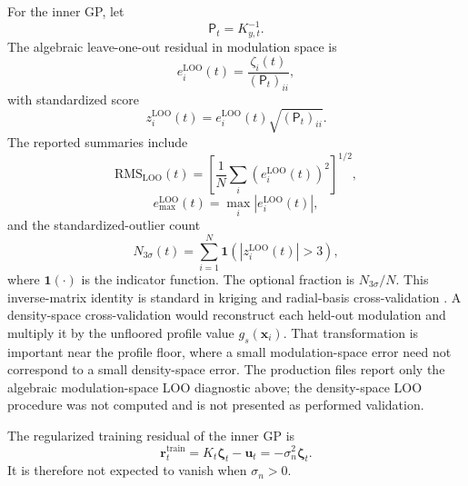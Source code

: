 \documentclass[
  11pt,
  letterpaper,
  onehalfspacing,
  normalmargins,
  equalmargins,
  oneside
]{ut-thesis}
\begin{document}
For the inner GP, let
\begin{equation}
\mathsf P_t=K_{y,t}^{-1}.
\label{eq:gp-loo-inverse-current}
\end{equation}
The algebraic leave-one-out residual in modulation space is
\begin{equation}
 e_i^{\mathrm{LOO}}(t)
=
\frac{\zeta_i(t)}{(\mathsf P_t)_{ii}},
\label{eq:gp-current-loo-residual}
\end{equation}
with standardized score
\begin{equation}
 z_i^{\mathrm{LOO}}(t)
=
 e_i^{\mathrm{LOO}}(t)
\sqrt{(\mathsf P_t)_{ii}}.
\label{eq:gp-current-loo-zscore}
\end{equation}
The reported summaries include
\begin{equation}
\mathrm{RMS}_{\mathrm{LOO}}(t)
=
\left[
\frac{1}{N}
\sum_i
\left(e_i^{\mathrm{LOO}}(t)\right)^2
\right]^{1/2},
\label{eq:gp-loo-rms}
\end{equation}
\begin{equation}
 e_{\max}^{\mathrm{LOO}}(t)
=
\max_i
\left|e_i^{\mathrm{LOO}}(t)\right|,
\label{eq:gp-loo-max}
\end{equation}
and the standardized-outlier count
\begin{equation}
N_{3\sigma}(t)
=
\sum_{i=1}^{N}
\mathbf 1\!\left(
\left|z_i^{\mathrm{LOO}}(t)\right|>3
\right),
\label{eq:gp-loo-outlier-count}
\end{equation}
where \(\mathbf 1(\cdot)\) is the indicator function. The optional fraction is
\(N_{3\sigma}/N\).
This inverse-matrix identity is standard in kriging and radial-basis
\mbox{cross-validation} \cite{Dubrule1983,Rippa1999}. A density-space cross-validation
would reconstruct each held-out modulation and multiply it by the unfloored
profile value \(g_s(\mathbf x_i)\). That transformation is important near the
profile floor, where a small modulation-space error need not correspond to a
small density-space error. The production files report only the algebraic
modulation-space LOO diagnostic above; the density-space LOO procedure was not
computed and is not presented as performed validation.

The regularized training residual of the inner GP is
\begin{equation}
\mathbf r_t^{\mathrm{train}}
=
K_t\boldsymbol\zeta_t-
\mathbf u_t
=
-
\sigma_n^2\boldsymbol\zeta_t.
\label{eq:gp-training-residual-identity}
\end{equation}
It is therefore not expected to vanish when \(\sigma_n>0\).
\end{document}
